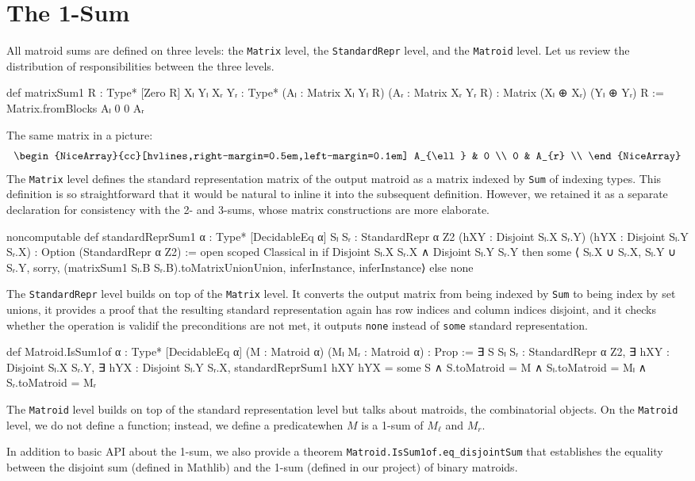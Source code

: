 \section{The 1-Sum}

All matroid sums are defined on three levels: the \texttt{Matrix} level, the \texttt{StandardRepr} level, and the \texttt{Matroid} level. Let us review the distribution of responsibilities between the three levels.
\begin{leancode}
def matrixSum1 {R : Type*} [Zero R]
    {Xₗ Yₗ Xᵣ Yᵣ : Type*}
    (Aₗ : Matrix Xₗ Yₗ R) (Aᵣ : Matrix Xᵣ Yᵣ R) :
    Matrix (Xₗ ⊕ Xᵣ) (Yₗ ⊕ Yᵣ) R :=
  Matrix.fromBlocks Aₗ 0 0 Aᵣ
\end{leancode}
The same matrix in a picture:
\[
    \renewcommand{\arraystretch}{1.4}
    \begin{NiceArray}{cc}[hvlines,right-margin=0.5em,left-margin=0.1em]
        A_{\ell} & 0 \\
        0 & A_{r} \\
    \end{NiceArray}
\]
The \texttt{Matrix} level defines the standard representation matrix of the output matroid as a matrix indexed by \texttt{Sum} of indexing types. This definition is so straightforward that it would be natural to inline it into the subsequent definition. However, we retained it as a separate declaration for consistency with the 2- and 3-sums, whose matrix constructions are more elaborate.
\begin{leancode}
noncomputable def standardReprSum1
    {α : Type*} [DecidableEq α]
    {Sₗ Sᵣ : StandardRepr α Z2}
    (hXY : Disjoint Sₗ.X Sᵣ.Y)
    (hYX : Disjoint Sₗ.Y Sᵣ.X) :
    Option (StandardRepr α Z2) :=
  open scoped Classical in if
    Disjoint Sₗ.X Sᵣ.X ∧ Disjoint Sₗ.Y Sᵣ.Y
  then
    some ⟨
      Sₗ.X ∪ Sᵣ.X,
      Sₗ.Y ∪ Sᵣ.Y,
      sorry,
      (matrixSum1 Sₗ.B Sᵣ.B).toMatrixUnionUnion,
      inferInstance,
      inferInstance⟩
  else
    none
\end{leancode}
The \texttt{StandardRepr} level builds on top of the \texttt{Matrix} level.
It converts the output matrix from being indexed by \texttt{Sum} to
being index by set unions, it provides a proof that the resulting
standard representation again has row indices and column indices disjoint,
and it checks whether the operation is valid\EmDash if the preconditions
are not met, it outputs \texttt{none} instead of \texttt{some} standard representation.
\begin{leancode}
def Matroid.IsSum1of {α : Type*} [DecidableEq α]
    (M : Matroid α) (Mₗ Mᵣ : Matroid α) :
    Prop :=
  ∃ S Sₗ Sᵣ : StandardRepr α Z2,
  ∃ hXY : Disjoint Sₗ.X Sᵣ.Y,
  ∃ hYX : Disjoint Sₗ.Y Sᵣ.X,
  standardReprSum1 hXY hYX = some S
  ∧ S.toMatroid = M
  ∧ Sₗ.toMatroid = Mₗ
  ∧ Sᵣ.toMatroid = Mᵣ
\end{leancode}
The \texttt{Matroid} level builds on top of the standard representation level but
talks about matroids, the combinatorial objects. On the \texttt{Matroid} level, we
do not define a function; instead, we define a predicate\EmDash when $M$ is
a 1-sum of $M_{\ell}$ and $M_{r}$.

In addition to basic API about the 1-sum, we also provide
a theorem \texttt{Matroid.IsSum1of.eq\_disjointSum} that establishes
the equality between the disjoint sum (defined in Mathlib) and
the 1-sum (defined in our project) of binary matroids.
